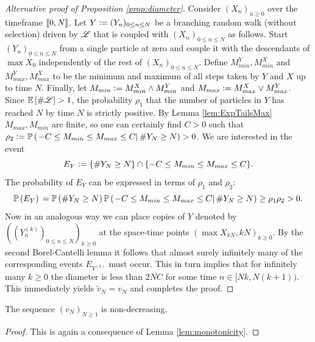 \begin{proof}[Alternative proof of Proposition \ref{prop:diameter}]
Consider $(X_n)_{n \geq 0}$ over the timeframe $\llbracket0, N\rrbracket$. Let $Y \vcentcolon= (Y_n)_{0 \leq n \leq N}$ be a branching random walk (without selection) driven by $\mathscr{L}$ that is coupled with $(X_n)_{0 \leq n \leq N}$ as follows. Start $(Y_n)_{0 \leq n \leq N}$ from a single particle at zero and couple it with the descendants of $\max X_0$ independently of the rest of $(X_n)_{0 \leq n \leq N}$. Define $M^Y_{min}, M^X_{min}$ and $M^Y_{max}, M^X_{max}$ to be the minimum and maximum of all steps taken by $Y$ and $X$ up to time $N$. Finally, let $M_{min} \vcentcolon= M^X_{min} \land M^Y_{min}$ and $M_{max} \vcentcolon= M^X_{max} \lor M^Y_{max}$. Since $\mathbb{E}\left[ \# \mathscr{L} \right] > 1$, the probability $\rho_1$ that the number of particles in $Y$ has reached $N$ by time $N$ is strictly positive. By Lemma \ref{lem:ExpTailsMax} $M_{max}, M_{min}$ are finite, so one can certainly find $C > 0$ such that $\rho_2 \vcentcolon= \mathbb{P} \left( \left. -C \leq M_{min} \leq M_{max} \leq C  \right| \# Y_N \geq N \right) > 0$. We are interested in the event
\begin{equation}\nonumber
E_Y \vcentcolon= \{ \# Y_N \geq N \} \cap \{-C \leq M_{min} \leq M_{max} \leq C \}. 
\end{equation}
The probability of $E_Y$ can be expressed in terms of $\rho_1$ and $\rho_2$:
\begin{equation}\nonumber
\mathbb{P} \left( E_Y \right) \\
= \mathbb{P} \left( \# Y_N \geq N \right) \mathbb{P} \left( \left. -C \leq M_{min} \leq M_{max} \leq C  \right| \# Y_N \geq N \right) \geq \rho_1 \rho_2 > 0.
\end{equation}
Now in an analogous way we can place copies of $Y$ denoted by $((Y^{(k)}_n)_{0 \leq n \leq N})_{k \geq 0}$ at the space-time points $(\max X_{kN}, kN)_{k \geq 0}$. By the second Borel-Cantelli lemma it follows that almost surely infinitely many of the corresponding events $E_{Y^{(k)}}$ must occur. This in turn implies that for infinitely many $k \geq 0$ the diameter is less than $2NC$ for some time $n \in [Nk, N(k+1))$. This immediately yields $\tilde{v}_N = v_N$ and completes the proof. 
\end{proof}

\begin{proposition}\label{prop:increasing_speed}
The sequence $(v_N)_{N \geq 1}$ is non-decreasing. 
\end{proposition}
\begin{proof}
This is again a consequence of Lemma \ref{lem:monotonicity}. 
\end{proof}

